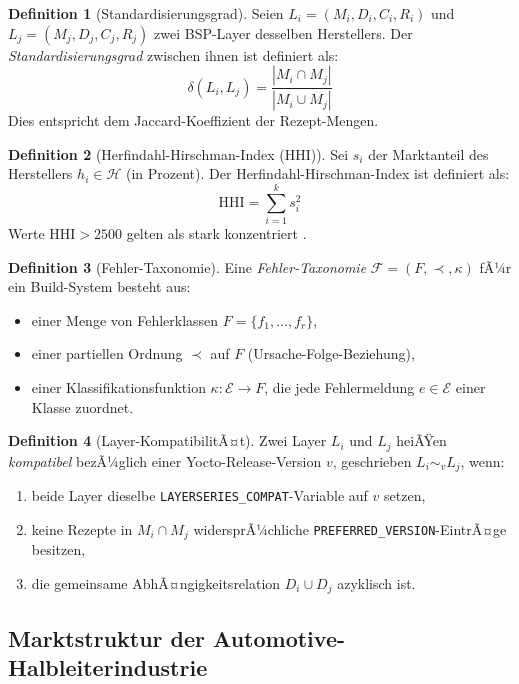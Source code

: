 ﻿\documentclass[a4paper,12pt]{article}
\theoremstyle{definition}
\newtheorem{definition}{Definition}
\begin{document}
\begin{definition}[Standardisierungsgrad]
	Seien $L_i = (M_i, D_i, C_i, R_i)$ und $L_j = (M_j, D_j, C_j, R_j)$ zwei BSP-Layer
	desselben Herstellers. Der \emph{Standardisierungsgrad} zwischen ihnen ist definiert als:
	\[
	\delta(L_i, L_j) = \frac{|M_i \cap M_j|}{|M_i \cup M_j|}
	\]
	Dies entspricht dem Jaccard-Koeffizient der Rezept-Mengen.
\end{definition}

\begin{definition}[Herfindahl-Hirschman-Index (HHI)]
	Sei $s_i$ der Marktanteil des Herstellers $h_i \in \mathcal{H}$ (in Prozent).
	Der Herfindahl-Hirschman-Index ist definiert als:
	\[
	\mathrm{HHI} = \sum_{i=1}^{k} s_i^2
	\]
	Werte $\mathrm{HHI} > 2500$ gelten als stark konzentriert \cite{doj2010}.
\end{definition}

\begin{definition}[Fehler-Taxonomie]
	Eine \emph{Fehler-Taxonomie} $\mathcal{F} = (F, \prec, \kappa)$ fÃ¼r ein Build-System besteht aus:
	\begin{itemize}
		\item einer Menge von Fehlerklassen $F = \{f_1, \ldots, f_r\}$,
		\item einer partiellen Ordnung $\prec$ auf $F$ (Ursache-Folge-Beziehung),
		\item einer Klassifikationsfunktion $\kappa: \mathcal{E} \to F$,
		      die jede Fehlermeldung $e \in \mathcal{E}$ einer Klasse zuordnet.
	\end{itemize}
\end{definition}

\begin{definition}[Layer-KompatibilitÃ¤t]
	Zwei Layer $L_i$ und $L_j$ heiÃŸen \emph{kompatibel} bezÃ¼glich einer
	Yocto-Release-Version $v$, geschrieben $L_i \sim_v L_j$, wenn:
	\begin{enumerate}
		\item beide Layer dieselbe \texttt{LAYERSERIES\_COMPAT}-Variable auf $v$ setzen,
		\item keine Rezepte in $M_i \cap M_j$ widersprÃ¼chliche \texttt{PREFERRED\_VERSION}-EintrÃ¤ge besitzen,
		\item die gemeinsame AbhÃ¤ngigkeitsrelation $D_i \cup D_j$ azyklisch ist.
	\end{enumerate}
\end{definition}

\subsection{Marktstruktur der Automotive-Halbleiterindustrie}
\end{document}

